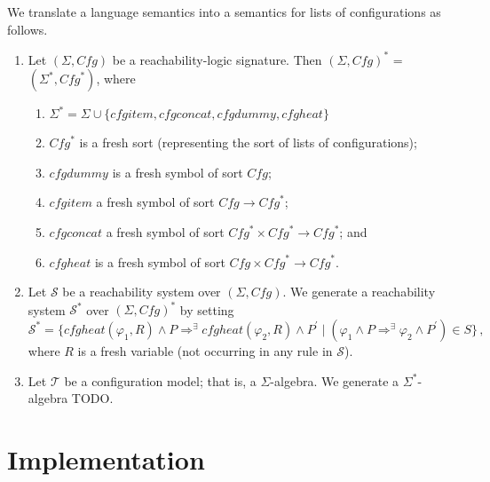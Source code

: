 \documentclass{article}
\begin{document}
\begin{definition}
We translate a language semantics into a semantics for lists of configurations as follows.
\begin{enumerate}
    \item Let $(\Sigma, \mathit{Cfg})$ be a reachability-logic signature.
          Then $(\Sigma, \mathit{Cfg})^*$ = $(\Sigma^*, \mathit{Cfg}^*)$,
          where
          \begin{enumerate}
              \item $\Sigma^* = \Sigma \cup \{ \mathit{cfgitem}, \mathit{cfgconcat},
          \mathit{cfgdummy}, \mathit{cfgheat} \}$
              \item $\mathit{Cfg}^*$ is a fresh sort (representing the sort of lists of configurations);
              \item $\mathit{cfgdummy}$ is a fresh symbol of sort $\mathit{Cfg}$;
              \item $\mathit{cfgitem}$ a fresh symbol of sort $\mathit{Cfg} \to \mathit{Cfg}^*$;
              \item $\mathit{cfgconcat}$ a fresh symbol of sort $\mathit{Cfg}^* \times \mathit{Cfg}^* \to \mathit{Cfg}^*$; and
              \item $\mathit{cfgheat}$ is a fresh symbol of sort $\mathit{Cfg} \times \mathit{Cfg}^* \to \mathit{Cfg}^*$.
          \end{enumerate}
    \item Let $\mathcal{S}$ be a reachability system over $(\Sigma, \mathit{Cfg})$.
          We generate a reachability system $\mathcal{S}^*$ over $(\Sigma, \mathit{Cfg})^*$
          by setting
          \begin{equation*}
              \mathcal{S}^* = \{ \mathit{cfgheat}(\varphi_1, R) \land P \Rightarrow^\exists \mathit{cfgheat}(\varphi_2, R) \land P^\prime \mid (\varphi_1 \land P \Rightarrow^\exists \varphi_2 \land P^\prime) \in S \} \, ,
          \end{equation*}
          where $R$ is a fresh variable (not occurring in any rule in $\mathcal{S}$).
    \item Let $\mathcal{T}$ be a configuration model; that is, a $\Sigma$-algebra.
          We generate a $\Sigma^*$-algebra TODO.
\end{enumerate}
\end{definition}

\section{Implementation}
\end{document}
